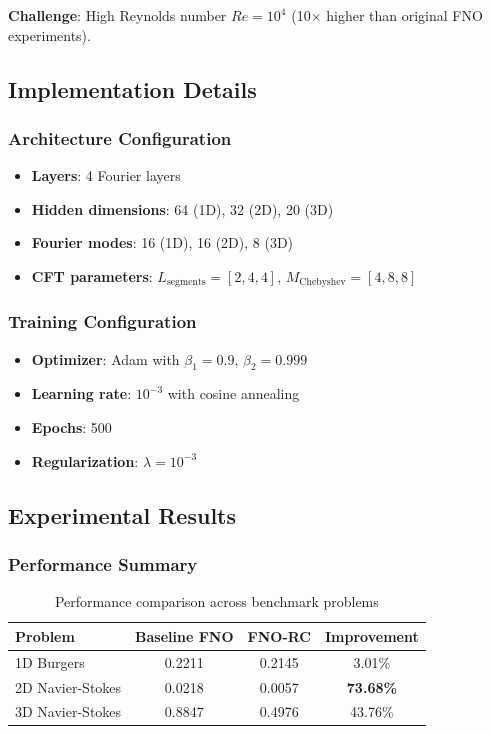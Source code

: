 \documentclass[11pt,twocolumn]{article}
\begin{document}
\textbf{Challenge}: High Reynolds number $Re = 10^4$ (10× higher than original FNO experiments).

\subsection{Implementation Details}

\subsubsection{Architecture Configuration}
\begin{itemize}
    \item \textbf{Layers}: 4 Fourier layers
    \item \textbf{Hidden dimensions}: 64 (1D), 32 (2D), 20 (3D)
    \item \textbf{Fourier modes}: 16 (1D), 16 (2D), 8 (3D)
    \item \textbf{CFT parameters}: $L_{\text{segments}} = [2, 4, 4]$, $M_{\text{Chebyshev}} = [4, 8, 8]$
\end{itemize}

\subsubsection{Training Configuration}
\begin{itemize}
    \item \textbf{Optimizer}: Adam with $\beta_1 = 0.9$, $\beta_2 = 0.999$
    \item \textbf{Learning rate}: $10^{-3}$ with cosine annealing
    \item \textbf{Epochs}: 500
    \item \textbf{Regularization}: $\lambda = 10^{-3}$
\end{itemize}

\subsection{Experimental Results}

\subsubsection{Performance Summary}

\begin{table}[h]
\centering
\caption{Performance comparison across benchmark problems}
\label{tab:main_results}
\small
\begin{tabular}{@{}lccc@{}}
\toprule
\textbf{Problem} & \textbf{Baseline FNO} & \textbf{FNO-RC} & \textbf{Improvement} \\
\midrule
1D Burgers & 0.2211 & 0.2145 & 3.01\% \\
2D Navier-Stokes & 0.0218 & 0.0057 & \textbf{73.68\%} \\
3D Navier-Stokes & 0.8847 & 0.4976 & 43.76\% \\
\bottomrule
\end{tabular}
\end{table}
\end{document}
